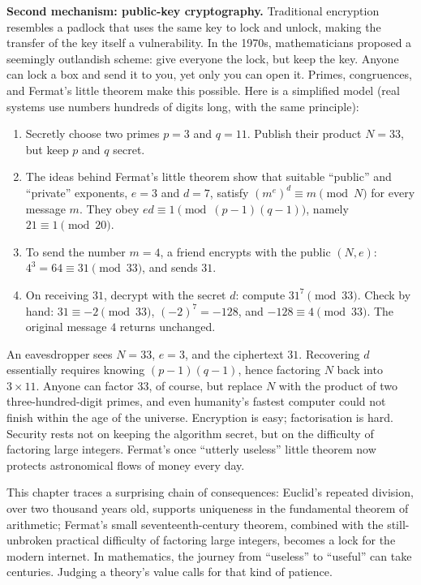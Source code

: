 \textbf{Second mechanism: public-key cryptography.} Traditional encryption resembles a padlock that uses the same key to lock and unlock, making the transfer of the key itself a vulnerability. In the 1970s, mathematicians proposed a seemingly outlandish scheme: give everyone the lock, but keep the key. Anyone can lock a box and send it to you, yet only you can open it. Primes, congruences, and Fermat's little theorem make this possible. Here is a simplified model (real systems use numbers hundreds of digits long, with the same principle):

\begin{enumerate}
  \item Secretly choose two primes $p=3$ and $q=11$. Publish their product $N=33$, but keep $p$ and $q$ secret.
  \item The ideas behind Fermat's little theorem show that suitable ``public'' and ``private'' exponents, $e=3$ and $d=7$, satisfy $(m^e)^d\equiv m\pmod N$ for every message $m$. They obey $ed\equiv1\pmod{(p-1)(q-1)}$, namely $21\equiv1\pmod{20}$.
  \item To send the number $m=4$, a friend encrypts with the public $(N,e)$: $4^3=64\equiv31\pmod{33}$, and sends $31$.
  \item On receiving $31$, decrypt with the secret $d$: compute $31^7\pmod{33}$. Check by hand: $31\equiv-2\pmod{33}$, $(-2)^7=-128$, and $-128\equiv4\pmod{33}$. The original message $4$ returns unchanged.
\end{enumerate}

An eavesdropper sees $N=33$, $e=3$, and the ciphertext $31$. Recovering $d$ essentially requires knowing $(p-1)(q-1)$, hence factoring $N$ back into $3\times11$. Anyone can factor $33$, of course, but replace $N$ with the product of two three-hundred-digit primes, and even humanity's fastest computer could not finish within the age of the universe. Encryption is easy; factorisation is hard. Security rests not on keeping the algorithm secret, but on the difficulty of factoring large integers. Fermat's once ``utterly useless'' little theorem now protects astronomical flows of money every day.

\begin{lianjie}
This chapter traces a surprising chain of consequences: Euclid's repeated division, over two thousand years old, supports uniqueness in the fundamental theorem of arithmetic; Fermat's small seventeenth-century theorem, combined with the still-unbroken practical difficulty of factoring large integers, becomes a lock for the modern internet. In mathematics, the journey from ``useless'' to ``useful'' can take centuries. Judging a theory's value calls for that kind of patience.
\end{lianjie}

